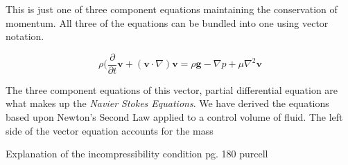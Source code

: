 \documentclass[twocolumn,12pth]{article}
\begin{document}
This is just one of three component equations maintaining the conservation of momentum.
All three of the equations can be bundled into one using vector notation.

\begin{equation}
\rho(\frac{\partial}{\partial{t}} \mathbf{v} + (\mathbf{v} \cdot \nabla)\mathbf{v} = \rho\mathbf{g} - \nabla{p} + \mu\nabla^2{\mathbf{v}}
\end{equation}

The three component equations of this vector, partial differential equation are what makes up the \textit{Navier Stokes Equations}.
We have derived the equations based upon Newton's Second Law applied to a control volume of fluid.
The left side of the vector equation accounts for the mass 

Explanation of the incompressibility condition pg. 180 purcell


\nocite{*}

\end{document}
